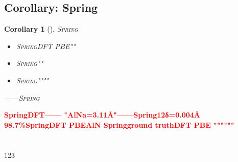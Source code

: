 \documentclass[12pt,a4paper]{article}
\newtheorem{corollary}[theorem]{Corollary}
\theoremstyle{remark}
\newcommand{\Spring}{\textsc{Spring}}
\newcommand{\honestcrit}[1]{%
    \textcolor{red}{\textbf{#1}}%
}
\begin{document}
\subsection{Corollary: Spring}

\begin{corollary}[]\label{cor:physics_self_audit}
\Spring{}

\begin{itemize}[itemsep=3pt]
    \item \Spring{}DFT PBE""
    \item \Spring{}""
    \item \Spring{}""""
\end{itemize}
——\Spring{}
\end{corollary}



\honestcrit{SpringDFT——
"AlNa=3.11{\AA}"——Spring12δ=0.004{\AA}
98.7\%SpringDFT PBEAlN
Springground truthDFT PBE
""""""}

\newpage

\section{}

\subsection{}

123
\end{document}
